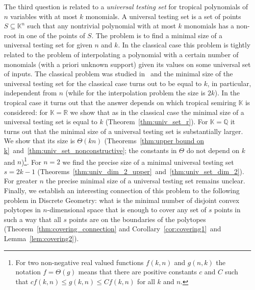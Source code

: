 \documentclass[11pt]{article}
\newcommand{\bb}[1]{\mathbb{#1}}
\begin{document}
The third question is related to a \emph{universal testing set} for tropical polynomials of $n$ variables with at most $k$ monomials. A universal testing set is a set of points $S \subseteq \bb{K}^n$ such that any nontrivial polynomial with at most $k$ monomials has a non-root in one of the points of $S$. The problem is to find a minimal size of a universal testing set for given $n$ and $k$. In the classical case this problem is tightly related to the problem of interpolating a polynomial with a certain number of monomials (with a priori unknown support) given its values on some universal set of inputs. The classical problem was studied in~\cite{GrigorievK87,Ben-OrT88,KaltofenY89,GrigorievKS91} and the minimal size of the universal testing set for the classical case turns out to be equal to $k$, in particular, independent from $n$ (while for the interpolation problem the size is $2k$). In the tropical case it turns out that the answer depends on which tropical semiring $\bb{K}$ is considered: for $\bb{K}=\bb{R}$ we show that as in the classical case the minimal size of a universal testing set is equal to $k$ (Theorem~\ref{thm:univ_set_r}). For $\bb{K}=\bb{Q}$ it turns out that the minimal size of a universal testing set is substantially larger. We show that its size is $\Theta(kn)$ (Theorems~\ref{thm:upper bound on k}~and~\ref{thm:univ_set_nonconstructive}; the constants in $\Theta$ do not depend on $k$ and $n$)\footnote{For two non-negative real valued functions $f(k,n)$ and $g(n,k)$ the notation $f = \Theta(g)$ means that there are positive constants $c$ and $C$ such that $cf(k,n) \leq g(k,n) \leq Cf(k,n)$ for all $k$ and $n$.}. For $n=2$ we find the precise size of a minimal universal testing set $s = 2k-1$ (Theorems~\ref{thm:univ_dim_2_upper}~and~\ref{thm:univ_set_dim_2}). For greater $n$ the precise minimal size of a universal testing set remains unclear. Finally, we establish an interesting connection of this problem to the following problem in Discrete Geometry: what is the minimal number of disjoint convex polytopes in $n$-dimensional space that is enough to cover any set of $s$ points in such a way that all $s$ points are on the boundaries of the polytopes (Theorem~\ref{thm:covering_connection} and Corollary~\ref{cor:covering1}~and Lemma~\ref{lem:covering2}).
\end{document}
